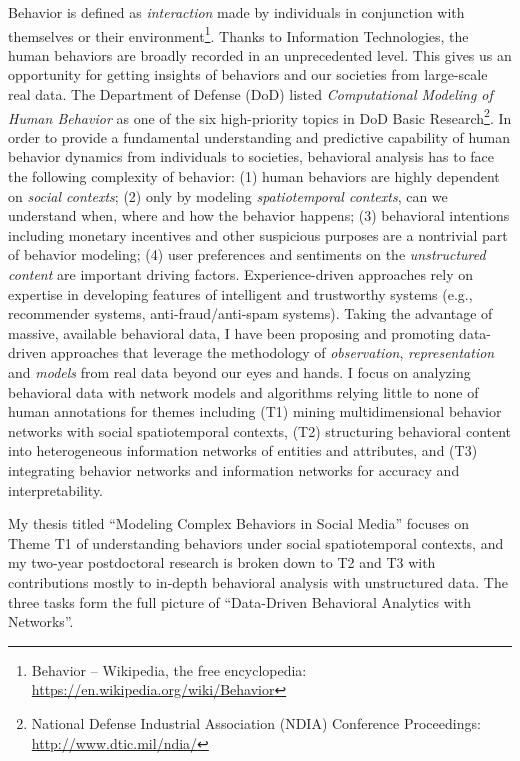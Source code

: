 \documentclass[10.5pt]{article}
\begin{document}
Behavior is defined as \textit{interaction} made by individuals in conjunction with themselves or their environment\footnote{Behavior -- Wikipedia, the free encyclopedia: \url{https://en.wikipedia.org/wiki/Behavior}}. Thanks to Information Technologies, the human behaviors are broadly recorded in an unprecedented level. This gives us an opportunity for getting insights of behaviors and our societies from large-scale real data. The Department of Defense (DoD) listed \textit{Computational Modeling of Human Behavior} as one of the six high-priority topics in DoD Basic Research\footnote{National Defense Industrial Association (NDIA) Conference Proceedings: \url{http://www.dtic.mil/ndia/}}. In order to provide a fundamental understanding and predictive capability of human behavior dynamics from individuals to societies, behavioral analysis has to face the following complexity of behavior: (1) human behaviors are highly dependent on \textit{social contexts}; (2) only by modeling \textit{spatiotemporal contexts}, can we understand when, where and how the behavior happens; (3) behavioral intentions including monetary incentives and other suspicious purposes are a nontrivial part of behavior modeling; (4) user preferences and sentiments on the \textit{unstructured content} are important driving factors. Experience-driven approaches rely on expertise in developing features of intelligent and trustworthy systems (e.g., recommender systems, anti-fraud/anti-spam systems). Taking the advantage of massive, available behavioral data, I have been proposing and promoting data-driven approaches that leverage the methodology of \textit{observation}, \textit{representation} and \textit{models} from real data beyond our eyes and hands. I focus on analyzing behavioral data with network models and algorithms relying little to none of human annotations for themes including (T1) mining multidimensional behavior networks with social spatiotemporal contexts, (T2) structuring behavioral content into heterogeneous information networks of entities and attributes, and (T3) integrating behavior networks and information networks for accuracy and interpretability.

\vskip 0.10in
\vskip 0.01in

My thesis titled ``Modeling Complex Behaviors in Social Media'' focuses on Theme T1 of understanding behaviors under social spatiotemporal contexts, and my two-year postdoctoral research is broken down to T2 and T3 with contributions mostly to in-depth behavioral analysis with unstructured data. The three tasks form the full picture of ``Data-Driven Behavioral Analytics with Networks''.
\end{document}
